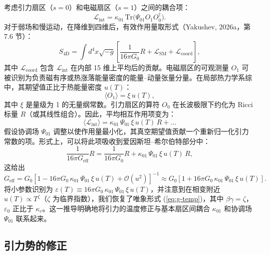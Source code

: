 \documentclass[12pt]{article}
\theoremstyle{remark}
\newcommand{\eps}{\varepsilon}
\newcommand{\kappac}{\kappa_c}
\newcommand{\lagr}{\mathcal{L}}
\begin{document}
	考虑引力扇区（$s=0$）和电磁扇区（$s=1$）之间的耦合项：
	\begin{equation}
		\lagr_{\text{int}} = \kappa_{01} \, \mathrm{Tr}\big(\Psi_{01} O_1 O_0^\dagger\big).
	\end{equation}
	对于弱场和慢运动，在降维到四维后，有效作用量取形式（Yakushev, 2026a，第 7.6 节）：
	\begin{equation}
		S_{\text{4D}} = \int d^4x \sqrt{-g} \left[ \frac{1}{16\pi G_0} R + \mathcal{L}_{\text{SM}} + \mathcal{L}_{\text{coord}} \right],
	\end{equation}
	其中 $\mathcal{L}_{\text{coord}}$ 包含 $\lagr_{\text{int}}$ 在内部 15 维上平均后的贡献。电磁扇区的可观测量 $O_1$ 可被识别为负责磁有序或热涨落能量密度的能量–动量张量分量。在局部热力学系综中，其期望值正比于热能量密度 $u(T)$：
	\begin{equation}
		\langle O_1 \rangle = \xi \, u(T),
	\end{equation}
	其中 $\xi$ 是量级为 1 的无量纲常数。引力扇区的算符 $O_0$ 在长波极限下约化为 Ricci 标量 $R$（或其线性组合）。因此，平均相互作用项变为：
	\begin{equation}
		\langle \lagr_{\text{int}} \rangle = \kappa_{01} \, \Psi_{01} \, \xi \, u(T) \, R + \dots
	\end{equation}
	假设协调场 $\Psi_{01}$ 调整以使作用量最小化，其真空期望值贡献一个重新归一化引力常数的项。形式上，可以将此项吸收到爱因斯坦–希尔伯特部分中：
	\begin{equation}
		\frac{1}{16\pi G_{\text{eff}}} R = \frac{1}{16\pi G_0} R + \kappa_{01} \, \Psi_{01} \, \xi \, u(T) \, R,
	\end{equation}
	这给出
	\begin{equation}
		G_{\text{eff}} = G_0 \left[ 1 - 16\pi G_0 \, \kappa_{01} \, \Psi_{01} \, \xi \, u(T) + \mathcal{O}(u^2) \right]^{-1} \approx G_0 \left[ 1 + 16\pi G_0 \, \kappa_{01} \, \Psi_{01} \, \xi \, u(T) \right].
	\end{equation}
	将小参数识别为 $\eps(T) \equiv 16\pi G_0 \, \kappa_{01} \, \Psi_{01} \, \xi \, u(T)$，并注意到在相变附近 $u(T) \propto T^{\zeta}$（$\zeta$ 为临界指数），我们恢复了唯象形式 (\ref{eq:g-temp})，其中 $\beta\gamma = \zeta$，$\eps_0$ 正比于 $\kappac$。这一推导明确地将引力的温度修正与基本扇区间耦合 $\kappa_{01}$ 和协调场 $\Psi_{01}$ 联系起来。
	
	\subsection{引力势的修正}
	\label{subsec:potential}
	
\end{document}
